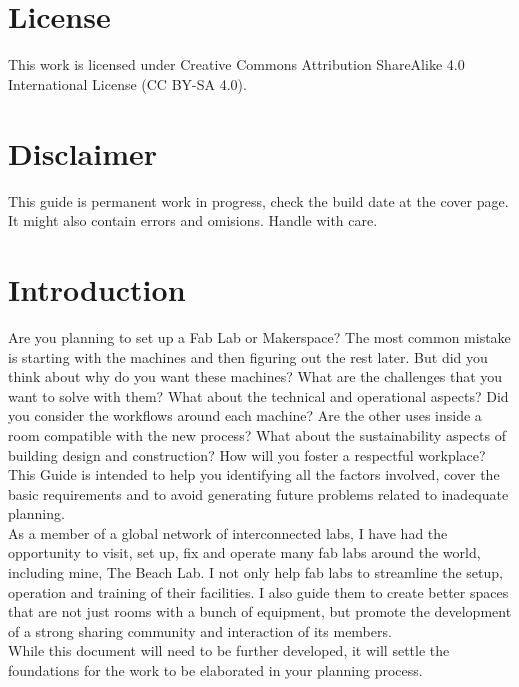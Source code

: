 \documentclass[a4paper,12pt,titlepage]{article}
\begin{document}
\\
\\

\section*{License}
This work is licensed under Creative Commons Attribution ShareAlike 4.0 International License (CC BY-SA 4.0). 

\section*{Disclaimer}
This guide is permanent work in progress, check the build date at the cover page. It might also contain errors and omisions. Handle with care.
\clearpage
\section{Introduction}
Are you planning to set up a Fab Lab or Makerspace? The most common mistake is starting with the machines and then figuring out the rest later. But did you think about why do you want these machines? What are the challenges that you want to solve with them?  What about the technical and operational aspects? Did you consider the workflows around each machine? Are the other uses inside a room compatible with the new process?  What about the sustainability aspects of building design and construction? How will you foster a respectful workplace? This Guide is intended to help you identifying all the factors involved, cover the basic requirements and to avoid generating future problems related to inadequate planning.\\

As a member of a global network of interconnected labs, I have had the opportunity to
visit, set up, fix and operate many fab labs around the world, including mine, The Beach Lab. I not
only help fab labs to streamline the setup, operation and training of their facilities. I also
guide them to create better spaces that are not just rooms with a bunch of equipment, but
promote the development of a strong sharing community and interaction of its members.\\

While this document will need to be further
developed, it will settle the foundations for the work to be elaborated in your planning process.
\end{document}

